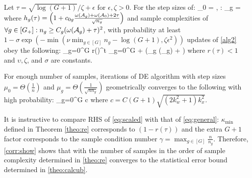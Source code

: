 \begin{theorem}
	\label{theo:step}		
	Let $\tau = \sqrt{\log(G+1)}/\zeta + \epsilon$ for $\epsilon, \zeta > 0$. For the step sizes of:
	\be
	\nr
	\mu_0 =  ,
	\forall \in [G]: \mu_g =   
	\ee
	where $h_g(\tau) = \left(1 + c_{0g} \frac{\omega(\cA_g) + \omega(\cA_0) + 2\tau}{\sqrt{n_g}}\right)$
	and sample complexities of $\forall g \in [G_+]: n_g \geq C_g (\omega(\cA_g) + \tau)^2$,
	with probability at least $ 1 - \sigma \exp(- \min(\nu \min_{g \in [G]} n_g - \log(G+1), \zeta \epsilon^2) )$ updates of \cref{alg2} obey the following:	
	\be
	\nr
	\sum_{g=0}^{G}  
	\leq r(\tau)^t \sum_{g=0}^{G}     
	+  \left(\max_{g \in [G_+]} \omega(\cA_g) + \tau \right)
	\ee
	where $r(\tau) < 1$ and $\upsilon, \zeta$, and $\sigma$ are constants.
	
\end{theorem}

\begin{corollary}
	\label{corr:show}
	For enough number of samples, iterations of DE algorithm with step sizes $\mu_0 = \Theta(\frac{1}{n})$ and $\mu_g =  \Theta(\frac{1}{\sqrt{n n_g}})$ geometrically converges to the following with high probability:
	{\small\beq
	\label{eq:scaled}
	\sum_{g=0}^{G}  
	\leq c 
	\eeq}
	where $c = C(G+1)\sqrt{(2k_w^2 + 1)k_x^2}$. 
\end{corollary}
	It is instructive to compare RHS of \cref{eq:scaled} with that of \cref{eq:general}: $\kappa_{\min}$ defined in Theorem \cref{theo:re} corresponds to $(1 - r(\tau))$ %
	and the extra $G+1$ factor corresponds to the sample condition number $\gamma = \max_{g \in [G] } \frac{n}{n_g}$.
	Therefore, \cref{corr:show} shows that with the number of samples in the order of sample complexity determined in \cref{theo:re} \dc{} converges to the statistical error bound determined in \cref{theo:calcub}.
	
